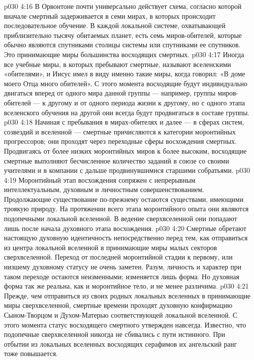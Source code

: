 \vs p030 4:16 \pc В Орвонтоне почти универсально действует схема, согласно которой вначале смертный задерживается в семи мирах, в которых происходит последовательное обучение. В каждой локальной системе, охватывающей приблизительно тысячу обитаемых планет, есть семь миров\hyp{}обителей, которые обычно являются спутниками столицы системы или спутниками ее спутников. Это принимающие миры большинства восходящих смертных.
\vs p030 4:17 Иногда все учебные миры, в которых пребывают смертные, называют вселенскими «обителями», и Иисус имел в виду именно такие миры, когда говорил: «В доме моего Отца много обителей». С этого момента восходящие будут индивидуально двигаться вперед от одного мира данной группы --- например, группы миров\hyp{}обителей --- к другому и от одного периода жизни к другому, но с одного этапа вселенского обучения на другой они всегда будут продвигаться в составе группы.
\vs p030 4:18 \pc {}\bibnobreakspace {} Начиная с пребывания в мирах\hyp{}обителях и далее --- в сферах систем, созвездий и вселенной --- смертные причисляются к категории моронтийных прогрессоров; они проходят через переходные сферы восхождения смертных. Продвигаясь от более низких моронтийных миров к более высоким, восходящие смертные выполняют бесчисленное количество заданий в союзе со своими учителями и в компании с дальше продвинувшимися старшими собратьями.
\vs p030 4:19 Моронтийный этап восхождения сопряжен с непрерывным интеллектуальным, духовным и личностным совершенствованием. Продолжающие существование по\hyp{}прежнему остаются существами, имеющими троякую природу. На протяжении всего этапа моронтийного опыта они являются подопечными локальной вселенной. В ведение сверхвселенной они попадают лишь после начала духовного этапа восхождения.
\vs p030 4:20 Смертные обретают настоящую духовную идентичность непосредственно перед тем, как отправиться из центра локальной вселенной в принимающие миры малых секторов сверхвселенной. Переход от последней моронтийной стадии к первому, или низшему духовному статусу не очень заметен. Разум, личность и характер при таком переходе остаются неизменными; изменяется лишь форма. Но духовная форма так же реальна, как и моронтийное тело, и не менее различима.
\vs p030 4:21 Прежде, чем отправиться из своих родных локальных вселенных в принимающие миры сверхвселенной, смертные времени проходят духовную конфирмацию Сыном\hyp{}Творцом и Духом\hyp{}Матерью соответствующей локальной вселенной. С этого момента статус восходящего смертного утвержден навсегда. Известно, что подопечные сверхвселенной никогда не сбивались с пути истинного. При отбытии из локальных вселенных восходящих серафимов их ангельский ранг тоже повышается.
